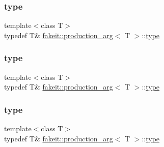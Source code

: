 \subsubsection{\texorpdfstring{type}{type}\hspace{0.1cm}{\footnotesize\ttfamily [1/9]}}
{\footnotesize\ttfamily template$<$class T$>$ \\
typedef T\& \mbox{\hyperlink{structfakeit_1_1production__arg}{fakeit\+::production\+\_\+arg}}$<$ T $>$\+::\mbox{\hyperlink{structfakeit_1_1production__arg_ade8b93fd6a2ff964755def8e4f87e69d}{type}}}

\mbox{\label{structfakeit_1_1production__arg_ade8b93fd6a2ff964755def8e4f87e69d}} 
\subsubsection{\texorpdfstring{type}{type}\hspace{0.1cm}{\footnotesize\ttfamily [2/9]}}
{\footnotesize\ttfamily template$<$class T$>$ \\
typedef T\& \mbox{\hyperlink{structfakeit_1_1production__arg}{fakeit\+::production\+\_\+arg}}$<$ T $>$\+::\mbox{\hyperlink{structfakeit_1_1production__arg_ade8b93fd6a2ff964755def8e4f87e69d}{type}}}

\mbox{\label{structfakeit_1_1production__arg_ade8b93fd6a2ff964755def8e4f87e69d}} 
\subsubsection{\texorpdfstring{type}{type}\hspace{0.1cm}{\footnotesize\ttfamily [3/9]}}
{\footnotesize\ttfamily template$<$class T$>$ \\
typedef T\& \mbox{\hyperlink{structfakeit_1_1production__arg}{fakeit\+::production\+\_\+arg}}$<$ T $>$\+::\mbox{\hyperlink{structfakeit_1_1production__arg_ade8b93fd6a2ff964755def8e4f87e69d}{type}}}

\mbox{\label{structfakeit_1_1production__arg_ade8b93fd6a2ff964755def8e4f87e69d}} 
